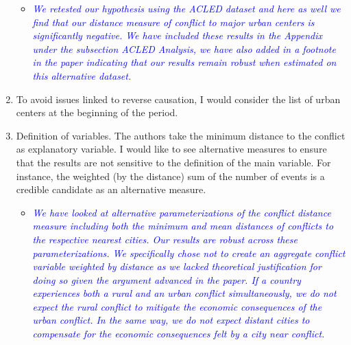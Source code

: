 \begin{enumerate}
\begin{itemize}
\item \textcolor{blue}{\emph{
	We retested our hypothesis using the ACLED dataset and here as well we find that our distance measure of conflict to major urban centers is significantly negative. We have included these results in the Appendix under the subsection ACLED Analysis, we have also added in a footnote in the paper indicating that our results remain robust when estimated on this alternative dataset.
}}
\end{itemize}

\item To avoid issues linked to reverse causation, I would consider the list of urban centers at the beginning of the period.


\item Definition of variables. The authors take the minimum distance to the conflict as explanatory variable. I would like to see alternative measures to ensure that the results are not sensitive to the definition of the main variable. For instance, the weighted (by the distance) sum of the number of events is a credible candidate as an alternative measure.

\begin{itemize}
\item \textcolor{blue}{\emph{
	We have looked at alternative parameterizations of the conflict distance measure including both the minimum and mean distances of conflicts to the respective nearest cities. Our results are robust across these parameterizations. We specifically chose not to create an aggregate conflict variable weighted by distance as we lacked theoretical justification for doing so given the argument advanced in the paper. If a country experiences both a rural and an urban conflict simultaneously, we do not expect the rural conflict to mitigate the economic consequences of the urban conflict. In the same way, we do not expect distant cities to compensate for the economic consequences felt by a city near conflict.
}}
\end{itemize}

\end{enumerate}

